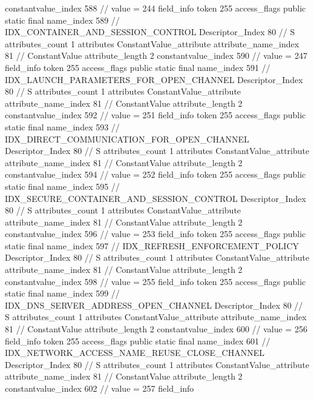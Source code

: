{{{{{{{					constantvalue_index	588		// value = 244
				}
				}
			}
			field_info {
				token	255
				access_flags	public static final
				name_index	589		// IDX_CONTAINER_AND_SESSION_CONTROL
				Descriptor_Index	80		// S
				attributes_count	1
				attributes {
				ConstantValue_attribute {
					attribute_name_index	81		// ConstantValue
					attribute_length	2
					constantvalue_index	590		// value = 247
				}
				}
			}
			field_info {
				token	255
				access_flags	public static final
				name_index	591		// IDX_LAUNCH_PARAMETERS_FOR_OPEN_CHANNEL
				Descriptor_Index	80		// S
				attributes_count	1
				attributes {
				ConstantValue_attribute {
					attribute_name_index	81		// ConstantValue
					attribute_length	2
					constantvalue_index	592		// value = 251
				}
				}
			}
			field_info {
				token	255
				access_flags	public static final
				name_index	593		// IDX_DIRECT_COMMUNICATION_FOR_OPEN_CHANNEL
				Descriptor_Index	80		// S
				attributes_count	1
				attributes {
				ConstantValue_attribute {
					attribute_name_index	81		// ConstantValue
					attribute_length	2
					constantvalue_index	594		// value = 252
				}
				}
			}
			field_info {
				token	255
				access_flags	public static final
				name_index	595		// IDX_SECURE_CONTAINER_AND_SESSION_CONTROL
				Descriptor_Index	80		// S
				attributes_count	1
				attributes {
				ConstantValue_attribute {
					attribute_name_index	81		// ConstantValue
					attribute_length	2
					constantvalue_index	596		// value = 253
				}
				}
			}
			field_info {
				token	255
				access_flags	public static final
				name_index	597		// IDX_REFRESH_ENFORCEMENT_POLICY
				Descriptor_Index	80		// S
				attributes_count	1
				attributes {
				ConstantValue_attribute {
					attribute_name_index	81		// ConstantValue
					attribute_length	2
					constantvalue_index	598		// value = 255
				}
				}
			}
			field_info {
				token	255
				access_flags	public static final
				name_index	599		// IDX_DNS_SERVER_ADDRESS_OPEN_CHANNEL
				Descriptor_Index	80		// S
				attributes_count	1
				attributes {
				ConstantValue_attribute {
					attribute_name_index	81		// ConstantValue
					attribute_length	2
					constantvalue_index	600		// value = 256
				}
				}
			}
			field_info {
				token	255
				access_flags	public static final
				name_index	601		// IDX_NETWORK_ACCESS_NAME_REUSE_CLOSE_CHANNEL
				Descriptor_Index	80		// S
				attributes_count	1
				attributes {
				ConstantValue_attribute {
					attribute_name_index	81		// ConstantValue
					attribute_length	2
					constantvalue_index	602		// value = 257
				}
				}
			}
			field_info {
}}}}}

